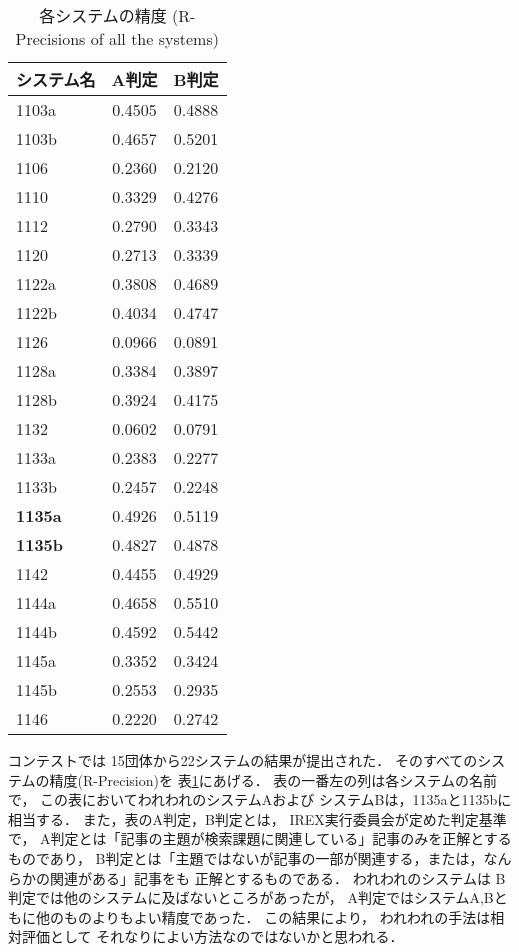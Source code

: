 \begin{table}[t]
\footnotesize
  \caption{各システムの精度 (R-Precisions of all the systems)}
  \label{tab:all_sys_result}
  \begin{center}
\begin{tabular}[c]{|l|c|c|}\hline
システム名 & \multicolumn{1}{c|}{A判定}  & \multicolumn{1}{c|}{B判定} \\\hline
1103a  & 0.4505 & 0.4888 \\
1103b  & 0.4657 & 0.5201 \\
1106   & 0.2360 & 0.2120 \\
1110   & 0.3329 & 0.4276 \\
1112   & 0.2790 & 0.3343 \\
1120   & 0.2713 & 0.3339 \\
1122a  & 0.3808 & 0.4689 \\
1122b  & 0.4034 & 0.4747 \\
1126   & 0.0966 & 0.0891 \\
1128a  & 0.3384 & 0.3897 \\
1128b  & 0.3924 & 0.4175 \\
1132   & 0.0602 & 0.0791 \\
1133a  & 0.2383 & 0.2277 \\
1133b  & 0.2457 & 0.2248 \\
{\bf 1135a}  & 0.4926 & 0.5119 \\
{\bf 1135b}  & 0.4827 & 0.4878 \\
1142   & 0.4455 & 0.4929 \\
1144a  & 0.4658 & 0.5510 \\
1144b  & 0.4592 & 0.5442 \\
1145a  & 0.3352 & 0.3424 \\
1145b  & 0.2553 & 0.2935 \\
1146   & 0.2220 & 0.2742 \\\hline
\end{tabular}
\end{center}
\end{table}


コンテストでは
15団体から22システムの結果が提出された．
そのすべてのシステムの精度(R-Precision)を
表\ref{tab:all_sys_result}にあげる．
表の一番左の列は各システムの名前で，
この表においてわれわれのシステムAおよび
システムBは，1135aと1135bに相当する．
また，表のA判定，B判定とは，
IREX実行委員会が定めた判定基準で，
A判定とは「記事の主題が検索課題に関連している」記事のみを正解とするものであり，
B判定とは「主題ではないが記事の一部が関連する，または，なんらかの関連がある」記事をも
正解とするものである．
われわれのシステムは
B判定では他のシステムに及ばないところがあったが，
A判定ではシステムA,Bともに他のものよりもよい精度であった．
この結果により，
われわれの手法は相対評価として
それなりによい方法なのではないかと思われる．

